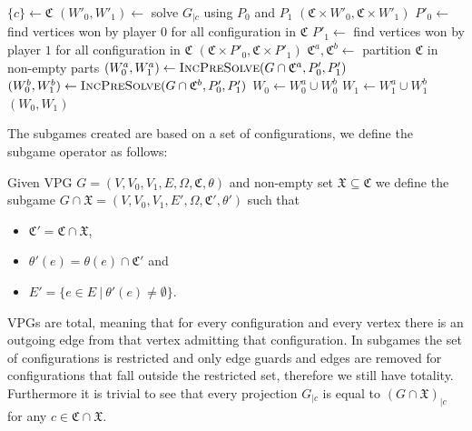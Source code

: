 \begin{algorithm}
	\caption{$\textsc{IncPreSolve}(G = (V,V_0,V_1, E, \Omega, \mathfrak{C}, \theta), P_0,P_1)$}\label{alg_IncPreSolveBasic}
	\begin{algorithmic}[1]
		\State $\{c\} \gets \mathfrak{C}$
		\State $(W'_0,W'_1) \gets $ solve $G_{|c}$ using $P_0$ and $P_1$
		\State \Return $(\mathfrak{C} \times W'_0, \mathfrak{C} \times W'_1)$
		\EndIf
		\State $P'_0 \gets$ find vertices won by player $0$ for all configuration in $\mathfrak{C}$
		\State $P'_1 \gets$ find vertices won by player $1$ for all configuration in $\mathfrak{C}$
		\State \Return $(\mathfrak{C} \times P'_0, \mathfrak{C} \times P'_1)$
		\EndIf
		\State $\mathfrak{C}^a, \mathfrak{C}^b \gets $ partition $\mathfrak{C}$ in non-empty parts
		\State $(W_0^a, W_1^a) \gets \textsc{IncPreSolve}(G \cap \mathfrak{C}^a, P'_0,P'_1)$
		\State $(W_0^b, W_1^b) \gets \textsc{IncPreSolve}(G \cap \mathfrak{C}^b, P'_0,P'_1)$
		\State $W_0 \gets W_0^a \cup W_0^b$
		\State $W_1 \gets W_1^a \cup W_1^b$
		\State \Return $(W_0,W_1)$
	\end{algorithmic}
\end{algorithm}
The subgames created are based on a set of configurations, we define the subgame operator as follows:
\begin{definition}
	Given VPG $G = (V,V_0,V_1,E,\Omega,\mathfrak{C},\theta)$ and non-empty set $\mathfrak{X} \subseteq \mathfrak{C}$ we define the subgame $G \cap \mathfrak{X} = (V,V_0,V_1,E',\Omega,\mathfrak{C}', \theta')$ such that
	\begin{itemize}
		\item $\mathfrak{C}' =\mathfrak{C} \cap \mathfrak{X}$,
		\item $\theta'(e) = \theta(e) \cap \mathfrak{C}'$ and
		\item $E' = \{ e \in E\ |\ \theta'(e) \neq \emptyset \}$.
	\end{itemize}
\end{definition}
VPGs are total, meaning that for every configuration and every vertex there is an outgoing edge from that vertex admitting that configuration. In subgames the set of configurations is restricted and only edge guards and edges are removed for configurations that fall outside the restricted set, therefore we still have totality. Furthermore it is trivial to see that every projection $G_{|c}$ is equal to $(G \cap \mathfrak{X})_{|c}$ for any $c \in \mathfrak{C} \cap \mathfrak{X}$.


